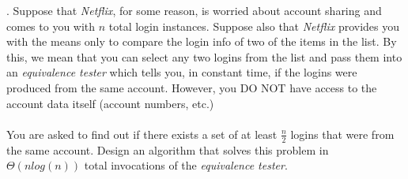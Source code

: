 \documentclass[12pt]{article}
\newcounter{quesnum}
\newcommand{\question}[2][??]{
\begin{list}{\labelitemi}{\leftmargin=2em}
\item [\arabic{quesnum}.] {} {#2}
\end{list}
\addtocounter{quesnum}{1}
}
\begin{document}
\question[3]{
Suppose that \emph{Netflix}, for some reason, is worried about account sharing and comes to you with $n$ total login instances. Suppose also that \emph{Netflix} provides you with the means only to compare the login info of two of the items in the list. By this, we mean that you can select any two logins from the list and pass them into an \emph{equivalence tester} which tells you, in constant time, if the logins were produced from the same account. However, you DO NOT have access to the account data itself (account numbers, etc.)\\
\\
You are asked to find out if there exists a set of at least $\frac{n}{2}$ logins that were from the same account. Design an algorithm that solves this problem in $\Theta(nlog(n))$ total invocations of the \emph{equivalence tester}.
}




\end{document}
